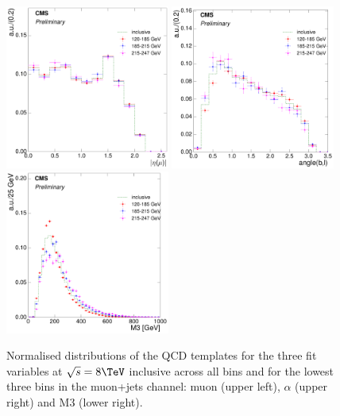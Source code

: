 \begin{figure}[hbtp]
    \centering
     \includegraphics[width=0.48\textwidth]{Chapters/04_Analysis/04b_XSections/images/8TeV/fit_variables/muon/HT/muon_absolute_eta/qcd/HT_muon_absolute_eta_0orMoreBtag_QCD_template_comparison.pdf}\hfill
     \includegraphics[width=0.48\textwidth]{Chapters/04_Analysis/04b_XSections/images/8TeV/fit_variables/muon/HT/angle_bl/qcd/HT_angle_bl_1orMoreBtag_QCD_template_comparison.pdf}\\
     \includegraphics[width=0.48\textwidth]{Chapters/04_Analysis/04b_XSections/images/8TeV/fit_variables/muon/HT/M3/qcd/HT_M3_0orMoreBtag_QCD_template_comparison.pdf}\\
	 \caption{Normalised distributions of the QCD templates for the three fit variables at $\sqrt{s}=8\TeV$
	 inclusive across all \HT bins and for the lowest three \HT bins in the muon+jets channel: muon \abseta
	 (upper left), $\alpha$ (upper right) and M3 (lower right).}
     \label{fig:HT_fit_variable_qcd_comparisons_muon_8TeV}
\end{figure}

